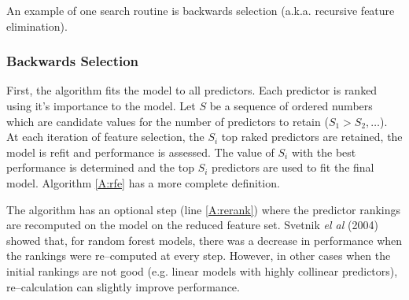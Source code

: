 \documentclass[12pt]{article}
\begin{document}
An example of one search routine is backwards selection (a.k.a. recursive feature elimination). 

\subsubsection{Backwards Selection}

First, the algorithm fits the model to all predictors. Each predictor is ranked using it's importance to the model. Let $S$ be a sequence of ordered numbers which are candidate values for the number of predictors to retain ($S_1 > S_2, \ldots$). At each iteration of feature selection, the $S_i$ top raked predictors are retained, the model is refit and performance is assessed. The value of $S_i$ with the best performance is determined and the top $S_i$ predictors are used to fit the final model. Algorithm \ref{A:rfe} has a more complete definition.

The algorithm has an optional step (line \ref{A:rerank}) where the predictor rankings are recomputed on the model on the reduced feature set. Svetnik {\it el al} (2004) showed that, for random forest models, there was a decrease in performance when the rankings were re--computed at every step. However, in other cases when the initial rankings are not good (e.g. linear models with highly collinear predictors), re--calculation can slightly improve performance.
\end{document}
